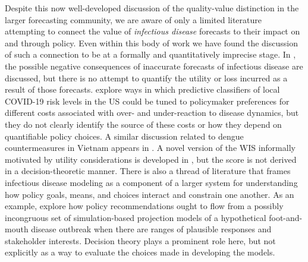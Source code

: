 \documentclass{article}
\begin{document}
Despite this now well-developed discussion of the quality-value distinction in the larger forecasting community, we are
aware of only a limited literature attempting to connect the value of \emph{infectious disease} forecasts to their
impact on and through policy.  Even within this body of work we have found the discussion of such a connection to
be at a formally and quantitatively imprecise stage. In \cite{ioannidis2022forecastingCOVIDfailed}, the possible negative
consequences of inaccurate forecasts of infectious disease are discussed, but there is no attempt to quantify the
utility or loss incurred as a result of those forecasts. \cite{bilinski_adaptive_2023} explore ways in which predictive
classifiers of local COVID-19 risk levels in the US could be tuned to policymaker preferences for different costs
associated with over- and under-reaction to disease dynamics, but they do not clearly identify the source of these
costs or how they depend on quantifiable policy choices. A similar discussion related to dengue countermeasures in
Vietnam appears in \cite{colon-gonzalez_probabilistic_2021}.  A novel version of the WIS informally motivated by
utility considerations is developed in \cite{marshall2023predictions}, but the score is not derived in a
decision-theoretic manner.  There is also a thread of literature that frames infectious disease modeling as a component
of a larger system for understanding how policy goals, means, and choices interact and constrain one another. As an
example, \cite{Probert2016decisionMakingFootMouth} explore how policy recommendations ought to flow from a possibly 
incongruous set of simulation-based projection models of a hypothetical foot-and-mouth disease outbreak when there are 
ranges of plausible responses and stakeholder interests. Decision theory plays a prominent role here, but not explicitly
as a way to evaluate the choices made in developing the models.
\end{document}
